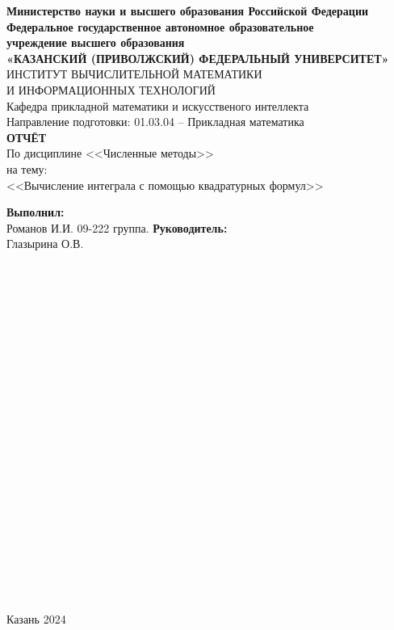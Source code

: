 \documentclass[14pt]{article}
\begin{document}
\begin{center}
\hfill \break
\textbf{\large{Министерство науки и высшего образования Российской Федерации\\
Федеральное государственное автономное образовательное\\
учреждение высшего образования}}
\\
\large{\textbf{«КАЗАНСКИЙ (ПРИВОЛЖСКИЙ) ФЕДЕРАЛЬНЫЙ УНИВЕРСИТЕТ»}}\\
\hfill \break
\large{ИНСТИТУТ ВЫЧИСЛИТЕЛЬНОЙ МАТЕМАТИКИ\\ И ИНФОРМАЦИОННЫХ ТЕХНОЛОГИЙ}\\
 \hfill \break
\large{Кафедра прикладной математики и искусственого интеллекта}\\
\hfill\break
\hfill \break
\large{Направление подготовки: 01.03.04 – Прикладная математика}\\
\hfill \break
\hfill \break
\textbf{\large{ОТЧЁТ}}\\
\large{По дисциплине <<Численные методы>>}\\
\large{на тему:}\\
\large{<<Вычисление интеграла с помощью квадратурных формул>>}\\
\hfill \break
\hfill \break
\end{center}

\hfill \break
\large{\textbf{Выполнил:}\\Романов И.И. 09-222 группа.}
\hfill \break
\hfill \break
\large{\textbf{Руководитель:}\\Глазырина О.В.}
\\
\\
\\
\\
\\
\\
\\
\\
\\
\\
\\
\\
\\
\\
\\
\\
\\
\\
\\
\\
\\
\\
\\
\begin{center} Казань 2024 \end{center}
\thispagestyle{empty}
 
\end{document}

